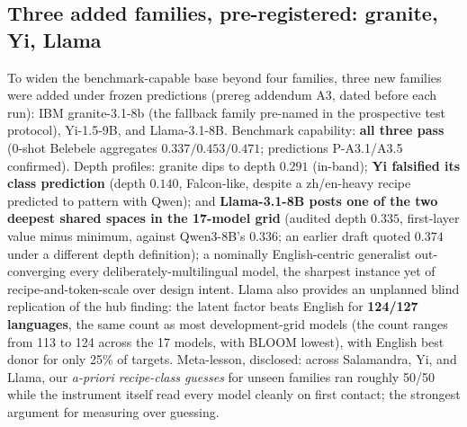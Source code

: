 \documentclass[11pt,a4paper]{article}
\begin{document}
\subsection*{Three added families, pre-registered: granite, Yi, Llama}
\label{sec:newfam}
To widen the benchmark-capable base beyond four families, three new families were
added under frozen predictions (prereg addendum A3, dated before each run):
IBM granite-3.1-8b (the fallback family pre-named in the prospective test
protocol), Yi-1.5-9B, and Llama-3.1-8B. Benchmark capability: \textbf{all three
pass} (0-shot Belebele aggregates $0.337 / 0.453 / 0.471$; predictions
P-A3.1/A3.5 confirmed). Depth profiles: granite dips to depth $0.291$
(in-band); \textbf{Yi falsified its class prediction} (depth $0.140$,
Falcon-like, despite a zh/en-heavy recipe predicted to pattern with Qwen);
and \textbf{Llama-3.1-8B posts one of the two deepest shared spaces in the 17-model grid} (audited depth $0.335$, first-layer value minus minimum, against Qwen3-8B's $0.336$; an earlier draft quoted $0.374$ under a different depth definition); a nominally English-centric
generalist out-converging every deliberately-multilingual model, the
sharpest instance yet of recipe-and-token-scale over design intent. Llama
also provides an unplanned blind replication of the hub finding: the latent
factor beats English for \textbf{124/127 languages}, the same count as most development-grid models (the count ranges from 113 to 124 across the 17 models, with BLOOM lowest), with English best donor for only 25\% of targets. Meta-lesson, disclosed: across Salamandra, Yi, and Llama, our
\emph{a-priori recipe-class guesses} for unseen families ran roughly 50/50
while the instrument itself read every model cleanly on first contact; the strongest argument for measuring over guessing.
\end{document}
